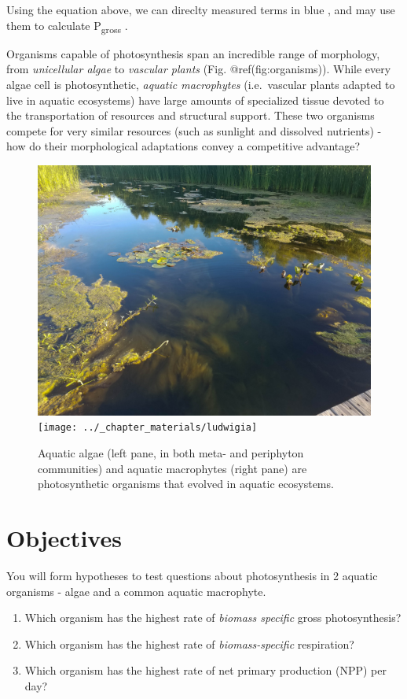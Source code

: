\documentclass[11pt,]{article}
\begin{document}
Using the equation above, we can direclty measured terms in \color{blue}
blue \color{black}, and may use them to calculate \color{red}
P\textsubscript{gross} \color{black}.

Organisms capable of photosynthesis span an incredible range of
morphology, from \emph{unicellular algae} to \emph{vascular plants}
(Fig. @ref(fig:organisms)). While every algae cell is photosynthetic,
\emph{aquatic macrophytes} (i.e.~vascular plants adapted to live in
aquatic ecosystems) have large amounts of specialized tissue devoted to
the transportation of resources and structural support. These two
organisms compete for very similar resources (such as sunlight and
dissolved nutrients) - how do their morphological adaptations convey a
competitive advantage?

\begin{figure}
\includegraphics[width=0.5\linewidth]{../_chapter_materials/aquatic_photosynthesis} \texttt{[image: ../\_chapter\_materials/ludwigia]} \caption{Aquatic algae (left pane, in both meta- and periphyton communities) and aquatic macrophytes (right pane) are photosynthetic organisms that evolved in aquatic ecosystems.}\label{fig:organisms}
\end{figure}

\hypertarget{objectives}{%
\section{Objectives}\label{objectives}}

You will form hypotheses to test questions about photosynthesis in 2
aquatic organisms - algae and a common aquatic macrophyte.

\begin{enumerate}
\def\labelenumi{\arabic{enumi}.}
\item
  Which organism has the highest rate of \emph{biomass specific} gross
  photosynthesis?
\item
  Which organism has the highest rate of \emph{biomass-specific}
  respiration?
\item
  Which organism has the highest rate of net primary production (NPP)
  per day?
\end{enumerate}
\end{document}
